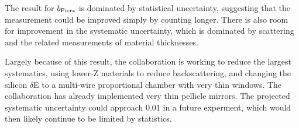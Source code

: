 The result for $b_{\mathrm{Fierz}}$ is dominated by statistical uncertainty, suggesting that the measurement could be improved simply by counting longer.  There is also room for improvement in the systematic uncertainty, which is dominated by scattering and the related measurements of material thicknesses.  

Largely because of this result,
the collaboration is working to reduce the largest systematics,
using lower-Z materials to reduce backscattering, and changing the silicon
$\delta$E to a multi-wire proportional chamber with very thin windows.
The collaboration has already implemented very thin pellicle mirrors.
The projected systematic uncertainty could approach 0.01 in a future
experment, which would then likely continue to be limited by statistics.
























